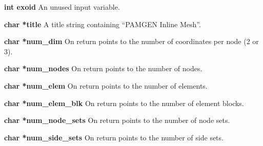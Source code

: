 {\setlength{\parindent}{0pt}
 \textbf{int exoid} An unused input variable.\par
 \textbf{char *title} A title string containing ``PAMGEN Inline Mesh''.\par
 \textbf{char *num\_dim} On return points to the number of coordinates per node (2 or 3).\par
 \textbf{char *num\_nodes} On return points to the number of nodes.\par
 \textbf{char *num\_elem} On return points to the number of elements.\par
 \textbf{char *num\_elem\_blk} On return points to the number of element blocks.\par
 \textbf{char *num\_node\_sets} On return points to the number of node sets.\par
 \textbf{char *num\_side\_sets} On return points to the number of side sets.\par
}

